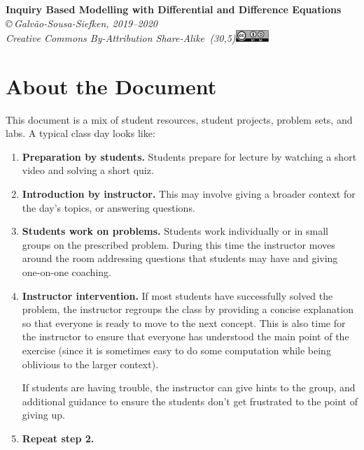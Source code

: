 \begin{center}
{\huge\bf Inquiry Based Modelling with Differential and Difference Equations}\\

\vspace{.7in}
{
\it \copyright\,Galv\~ao-Sousa-Siefken, 2019--2020 \\
Creative Commons By-Attribution Share-Alike\, \makebox(30,5){\includegraphics[height=1.2em]{by-sa.pdf}}
}
\end{center}

\section*{About the Document}


This document is a mix of student resources, student projects, problem sets, and labs. 
A typical class day looks like:
\begin{enumerate}
	\item \textbf{Preparation by students.} Students prepare for lecture by watching a short video and solving a short quiz. 

	\item \textbf{Introduction by instructor.} This may involve giving a broader context for the day's topics, or answering questions.

	\item \textbf{Students work on problems.} Students work individually or in small groups
		on the prescribed problem. During this time the instructor moves
		around the room addressing questions that students may have and giving
		one-on-one coaching.

	\item \textbf{Instructor intervention.} If most students have successfully solved
		the problem, the instructor regroups the class by providing a concise
		explanation so that everyone is ready to move to the next concept.
		This is also time for the instructor to ensure that everyone has
		understood the main point of the exercise (since it is sometimes
		easy to do some computation while being oblivious to the larger context).

		If students are having trouble, the instructor can give hints to
		the group, and additional guidance to ensure the students don't get
		frustrated to the point of giving up.

	\item \textbf{Repeat step 2.}
\end{enumerate}

